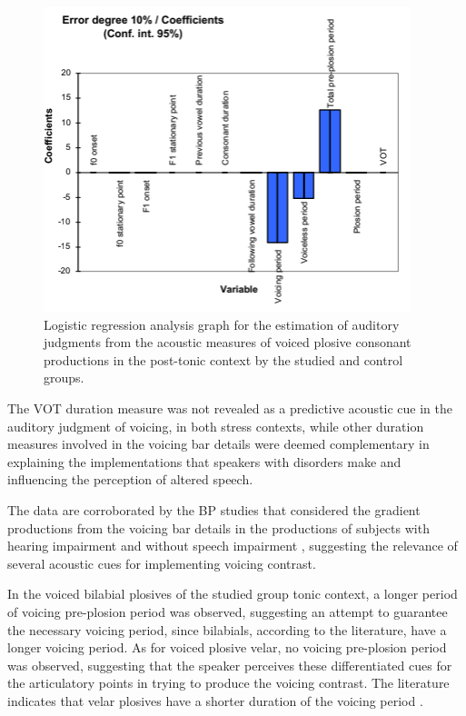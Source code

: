 \begin{figure}
\centering
\includegraphics[width=0.9\linewidth]{imgs/gregio-image18.png}
\caption{Logistic regression analysis graph for the estimation of auditory judgments from the acoustic measures of voiced plosive consonant productions in the post-tonic context by the studied and control groups.} 
\label{gregio-fig18}
\end{figure}

The VOT duration measure was not revealed as a predictive acoustic cue in the
auditory judgment of voicing, in both stress contexts, while other duration
measures involved in the voicing bar details were deemed complementary in
explaining the implementations that speakers with disorders make and
influencing the perception of altered speech.

The data are corroborated by the BP studies that considered the gradient
productions from the voicing bar details in the productions of subjects with
hearing impairment \citep{ficker2003,barzaghi2007,pereira2012} and
without speech impairment \citep{gregio2011}, suggesting the relevance of
several acoustic cues for implementing voicing contrast.

In the voiced bilabial plosives of the studied group tonic context, a longer
period of voicing pre-plosion period was observed, suggesting an attempt to
guarantee the necessary voicing period, since bilabials, according to the
literature, have a longer voicing period. As for voiced plosive velar, no
voicing pre-plosion period was observed, suggesting that the speaker perceives
these differentiated cues for the articulatory points in trying to produce the
voicing contrast. The literature indicates that velar plosives have a shorter
duration of the voicing period \citep{van_alphen2004,lousada2005,barzaghi2007,pereira2012}.

